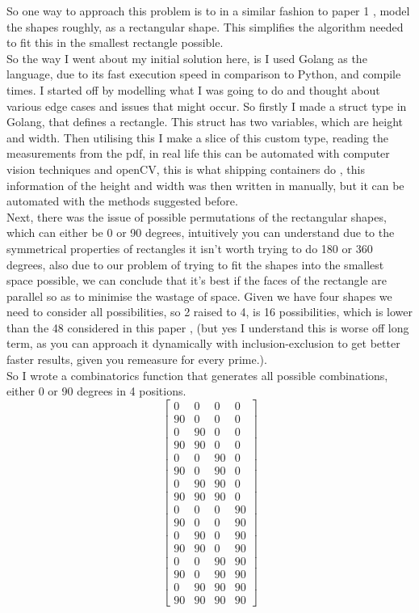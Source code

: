\documentclass[a4paper]{article}
\begin{document}
    
    So one way to approach this problem is to in a similar fashion to paper 1 \cite{mongolia}, model the shapes roughly, as a rectangular shape. This simplifies the algorithm needed to fit this in the smallest rectangle possible. \\

    So the way I went about my initial solution here, is I used Golang as the language, due to its fast execution speed in comparison to Python, and compile times. I started off by modelling what I was going to do and thought about various edge cases and issues that might occur. So firstly I made a struct type in Golang, that defines a rectangle. This struct has two variables, which are height and width. Then utilising this I make a slice of this custom type, reading the measurements from the pdf, in real life this can be automated with computer vision techniques and openCV, this is what shipping containers do \cite{packing}, this information of the height and width was then written in manually, but it can be automated with the methods suggested before.\\

    Next, there was the issue of possible permutations of the rectangular shapes, which can either be 0 or 90 degrees, intuitively you can understand due to the symmetrical properties of rectangles it isn't worth trying to do 180 or 360 degrees, also due to our problem of trying to fit the shapes into the smallest space possible, we can conclude that it's best if the faces of the rectangle are parallel so as to minimise the wastage of space. Given we have four shapes we need to consider all possibilities, so 2 raised to 4, is 16 possibilities, which is lower than the 48 considered in this paper \cite{bismark}, (but yes I understand this is worse off long term, as you can approach it dynamically with inclusion-exclusion to get better faster results, given you remeasure for every prime.). \\

    So I wrote a combinatorics function that generates all possible combinations, either 0 or 90 degrees in 4 positions. \\


    \[
\begin{bmatrix}
0 & 0 & 0 & 0 \\
90 & 0 & 0 & 0 \\
0 & 90 & 0 & 0 \\
90 & 90 & 0 & 0 \\
0 & 0 & 90 & 0 \\
90 & 0 & 90 & 0 \\
0 & 90 & 90 & 0 \\
90 & 90 & 90 & 0 \\
0 & 0 & 0 & 90 \\
90 & 0 & 0 & 90 \\
0 & 90 & 0 & 90 \\
90 & 90 & 0 & 90 \\
0 & 0 & 90 & 90 \\
90 & 0 & 90 & 90 \\
0 & 90 & 90 & 90 \\
90 & 90 & 90 & 90
\end{bmatrix}
\]
\end{document}

